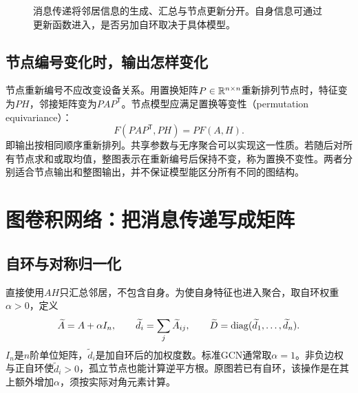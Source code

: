 \begin{figure}[htbp]
\centering
{}
\caption{消息传递将邻居信息的生成、汇总与节点更新分开。自身信息可通过更新函数进入，是否另加自环取决于具体模型。}
\label{fig:graph-message-passing}
\end{figure}

\subsection{节点编号变化时，输出怎样变化}
节点重新编号不应改变设备关系。用置换矩阵$P\in\mathbb{R}^{n\times n}$重新排列节点时，特征变为$PH$，邻接矩阵变为$PAP^{\mathsf T}$。节点模型应满足置换等变性（permutation equivariance）：
\begin{equation}
 F(PAP^{\mathsf T},PH)=PF(A,H).
 \label{eq:graph-permutation-equivariance}
\end{equation}
即输出按相同顺序重新排列。共享参数与无序聚合可以实现这一性质。若随后对所有节点求和或取均值，整图表示在重新编号后保持不变，称为置换不变性。两者分别适合节点输出和整图输出，并不保证模型能区分所有不同的图结构。

\section{图卷积网络：把消息传递写成矩阵}
\subsection{自环与对称归一化}
直接使用$AH$只汇总邻居，不包含自身。为使自身特征也进入聚合，取自环权重$\alpha>0$，定义
\begin{equation}
 \widetilde A=A+\alpha I_n,\qquad
 \widetilde d_i=\sum_j\widetilde A_{ij},\qquad
 \widetilde D=\operatorname{diag}(\widetilde d_1,\ldots,\widetilde d_n).
 \label{eq:graph-self-loop-degree}
\end{equation}
$I_n$是$n$阶单位矩阵，$\widetilde d_i$是加自环后的加权度数。标准GCN通常取$\alpha=1$。非负边权与正自环使$\widetilde d_i>0$，孤立节点也能计算逆平方根。原图若已有自环，该操作是在其上额外增加$\alpha$，须按实际对角元素计算。

